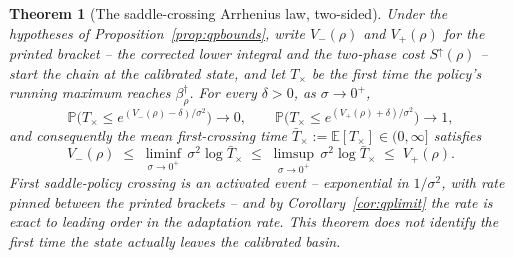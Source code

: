 \documentclass[11pt]{article}
\newtheorem{theorem}{Theorem}[section]
\theoremstyle{definition}
\theoremstyle{remark}
\numberwithin{equation}{section}
\begin{document}
\begin{theorem}[The saddle-crossing Arrhenius law, two-sided]\label{thm:arr}
Under the hypotheses of Proposition~\ref{prop:qpbounds}, write $V_-(\rho)$ and $V_+(\rho)$ for the printed bracket -- the corrected lower integral and the two-phase cost $S^{\uparrow}(\rho)$ -- start the chain at the calibrated state, and let $T_{\times}$ be the first time the policy's running maximum reaches $\beta^\dagger_\rho$. For every $\delta > 0$, as $\sigma \to 0^+$,
\[
\mathbb{P}\bigl(T_{\times} \le e^{(V_-(\rho)-\delta)/\sigma^2}\bigr) \longrightarrow 0,
\qquad
\mathbb{P}\bigl(T_{\times} \le e^{(V_+(\rho)+\delta)/\sigma^2}\bigr) \longrightarrow 1,
\]
and consequently the mean first-crossing time $\bar T_{\times} := \mathbb{E}[T_{\times}] \in (0,\infty]$ satisfies
\[
V_-(\rho) \;\le\; \liminf_{\sigma\to0^+}\, \sigma^2 \log \bar T_{\times}
\;\le\; \limsup_{\sigma\to0^+}\, \sigma^2 \log \bar T_{\times} \;\le\; V_+(\rho).
\]
First saddle-policy crossing is an activated event -- exponential in $1/\sigma^2$, with rate pinned between the printed brackets -- and by Corollary~\ref{cor:qplimit} the rate is exact to leading order in the adaptation rate. This theorem does not identify the first time the state actually leaves the calibrated basin.
\end{theorem}
\end{document}
